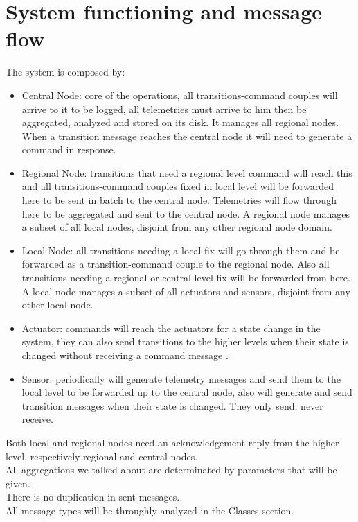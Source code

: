 \documentclass[11pt]{article}
\begin{document}
\section{System functioning and message flow}
The system is composed by:
\begin{itemize}
\item Central Node: core of the operations, all transitions-command couples will arrive to it to be logged, all telemetries must arrive to him then be aggregated, analyzed and stored on its disk. It manages all regional nodes. When a transition message reaches the central node it will need to generate a command in response.
\item Regional Node: transitions that need a regional level command will reach this and all transitions-command couples fixed in local level will be forwarded here to be sent in batch to the central node. Telemetries will flow through here to be aggregated and sent to the central node. A regional node manages a subset of all local nodes, disjoint from any other regional node domain.
\item Local Node: all transitions needing a local fix will go through them and be forwarded as a transition-command couple to the regional node. Also all transitions needing a regional or central level fix will be forwarded from here. A local node manages a subset of all actuators and sensors, disjoint from any other local node.
\item Actuator: commands will reach the actuators for a state change in the system, they can also send transitions to the higher levels when their state is changed without receiving a command message .
\item Sensor: periodically will generate telemetry messages and send them to the local level to be forwarded up to the central node, also will generate and send transition messages when their state is changed. They only send, never receive.
\end{itemize}
Both local and regional nodes need an acknowledgement reply from the higher level, respectively regional and central nodes. \\
All aggregations we talked about are determinated by parameters that will be given.\\
There is no duplication in sent messages.\\
All message types will be throughly analyzed in the Classes section.\\
\end{document}
